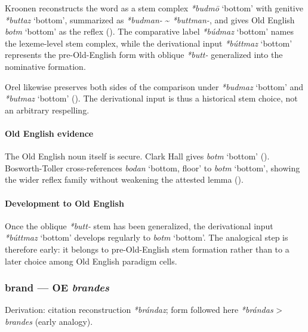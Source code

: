 \documentclass[
  british,
  a4paper,
]{article}
\providecommand{\Recon}[1]{\emph{*#1}}
\begin{document}
Kroonen reconstructs the word as a stem complex \Recon{budmō} `bottom'
with genitive \Recon{buttaz} `bottom', summarized as \emph{*budman-}
\textasciitilde{} \emph{*buttman-}, and gives Old English {\emph{botm}}
`bottom' as the reflex ().
The comparative label \Recon{búdmaz} `bottom' names the lexeme-level
stem complex, while the derivational input \Recon{búttmaz} `bottom'
represents the pre-Old-English form with oblique \emph{*butt-}
generalized into the nominative formation.

Orel likewise preserves both sides of the comparison under
\Recon{budmaz} `bottom' and \Recon{butmaz} `bottom'
(). The derivational input is
thus a historical stem choice, not an arbitrary respelling.

\paragraph{Old English evidence}\label{old-english-evidence-82}

The Old English noun itself is secure. Clark Hall gives {\emph{botm}}
`bottom' ().
Bosworth-Toller cross-references {\emph{bodan}} `bottom, floor' to
{\emph{botm}} `bottom', showing the wider reflex family without
weakening the attested lemma ().

\paragraph{Development to Old
English}\label{development-to-old-english-82}

Once the oblique \emph{*butt-} stem has been generalized, the
derivational input \Recon{búttmaz} `bottom' develops regularly to
{\emph{botm}} `bottom'. The analogical step is therefore early: it
belongs to pre-Old-English stem formation rather than to a later choice
among Old English paradigm cells.

\subsubsection{\texorpdfstring{brand --- OE
\emph{brandes}}{brand --- OE brandes}}\label{brand-oe-brandes}

Derivation: citation reconstruction \emph{*brándaz}; form followed here
\emph{*brándas} \textgreater{} \emph{brandes} (early analogy).
\end{document}
